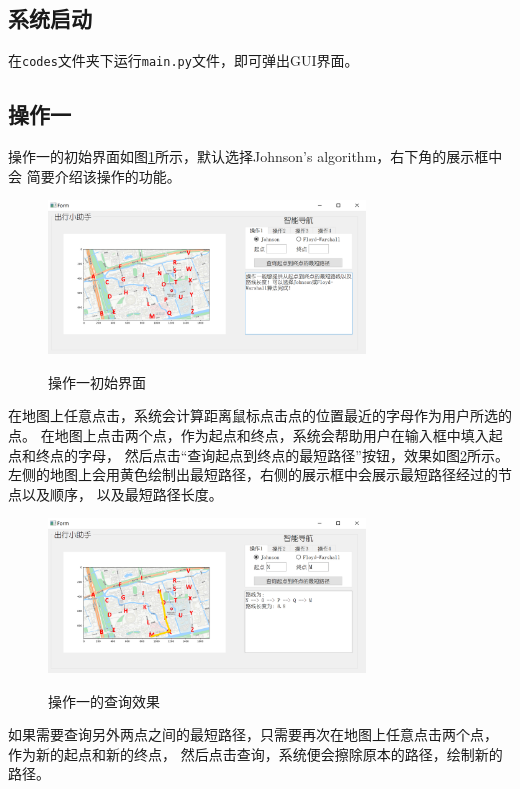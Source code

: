 \documentclass{article}
\begin{document}
\subsection{系统启动}
在\texttt{codes}文件夹下运行\texttt{main.py}文件，即可弹出GUI界面。


\subsection{操作一}
操作一的初始界面如图\ref{op1.init}所示，默认选择Johnson's algorithm，右下角的展示框中会
简要介绍该操作的功能。
\begin{figure}[H]
	\centering
	{\includegraphics[width=0.75\textwidth]{image//启动界面.png}} 
	\caption{操作一初始界面} \label{op1.init}
\end{figure}

在地图上任意点击，系统会计算距离鼠标点击点的位置最近的字母作为用户所选的点。
在地图上点击两个点，作为起点和终点，系统会帮助用户在输入框中填入起点和终点的字母，
然后点击“查询起点到终点的最短路径”按钮，效果如图\ref{op1.result}所示。
左侧的地图上会用黄色绘制出最短路径，右侧的展示框中会展示最短路径经过的节点以及顺序，
以及最短路径长度。
\begin{figure}[H]
	\centering
	{\includegraphics[width=0.75\textwidth]{image//操作一结果.png}} 
	\caption{操作一的查询效果} \label{op1.result}
\end{figure}
如果需要查询另外两点之间的最短路径，只需要再次在地图上任意点击两个点，
作为新的起点和新的终点，
然后点击查询，系统便会擦除原本的路径，绘制新的路径。
\end{document}
